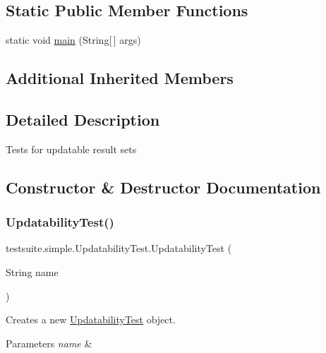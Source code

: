 \subsection*{Static Public Member Functions}
\begin{DoxyCompactItemize}
\item 
static void \mbox{\hyperlink{classtestsuite_1_1simple_1_1_updatability_test_aad2ca9a47cb41ccfdc8cf82a2335e1d0}{main}} (String\mbox{[}$\,$\mbox{]} args)
\end{DoxyCompactItemize}
\subsection*{Additional Inherited Members}


\subsection{Detailed Description}
Tests for updatable result sets 

\subsection{Constructor \& Destructor Documentation}
\mbox{\label{classtestsuite_1_1simple_1_1_updatability_test_a1ab7fd0482bf8c6fb2eec2e0bbc2be23}} 
\subsubsection{\texorpdfstring{Updatability\+Test()}{UpdatabilityTest()}}
{\footnotesize\ttfamily testsuite.\+simple.\+Updatability\+Test.\+Updatability\+Test (\begin{DoxyParamCaption}\item[{String}]{name }\end{DoxyParamCaption})}

Creates a new \mbox{\hyperlink{classtestsuite_1_1simple_1_1_updatability_test}{Updatability\+Test}} object.


\begin{DoxyParams}{Parameters}
{\em name} & \\
\hline
\end{DoxyParams}


